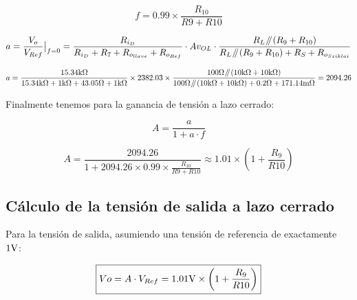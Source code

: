\begin{equation}
f = 0.99 \times \frac{R_{10}}{R{9} + R{10}}
\end{equation}


\begin{equation}
a = \evalat{\frac{V_{o}}{V_{Ref}}}{f=0} = \frac{  R_{i_{D}} }{ R_{i_{D}} + R_{7} + R_{o_{llave}} + R_{o_{Ref}}  } \cdot A{v_{OL}} \cdot \frac{  R_{L} \parallelresistors \left( R_{9} + R_{10} \right)  }{ R_{L} \parallelresistors \left( R_{9} + R_{10} \right) + R_{S} + R_{o_{Sziklai}} }
\end{equation}


\begin{equation*}
a = \frac{  15.34 \si[per-mode=symbol]{\kilo\ohm} }{ 15.34 \si[per-mode=symbol]{\kilo\ohm} + 1 \si[per-mode=symbol]{\kilo\ohm} + 43.05 \si[per-mode=symbol]{\ohm} + 1 \si[per-mode=symbol]{\kilo\ohm}  } \times 2382.03 \times \frac{ 100 \si[per-mode=symbol]{\ohm} \parallelresistors \left( 10 \si[per-mode=symbol]{\kilo\ohm} + 10 \si[per-mode=symbol]{\kilo\ohm} \right)  }{100 \si[per-mode=symbol]{\ohm} \parallelresistors \left( 10 \si[per-mode=symbol]{\kilo\ohm} + 10 \si[per-mode=symbol]{\kilo\ohm} \right) + 0.2 \si[per-mode=symbol]{\ohm} + 171.14 \si[per-mode=symbol]{\milli\ohm} } = 2094.26
\end{equation*}



Finalmente tenemos para la ganancia de tensión a lazo cerrado:


\begin{equation}
A = \frac{a}{1 + a \cdot f}
\end{equation}

\begin{equation*}
\boxed{ A = \frac{2094.26}{1 + 2094.26 \times 0.99 \times \frac{R_{10}}{R{9} + R{10}}} \approx 1.01 \times \left(  1 + \frac{R_{9}}{R{10}} \right) }
\end{equation*}

\subsection{Cálculo de la tensión de salida a lazo cerrado}


Para la tensión de salida, asumiendo una tensión de referencia de exactamente $1 \si[per-mode=symbol]{\volt}$:

\begin{equation*}
\boxed{ V{o} = A \cdot V_{Ref} = 1.01 \si[per-mode=symbol]{\volt} \times \left(  1 + \frac{R_{9}}{R{10}} \right) }
\end{equation*}



